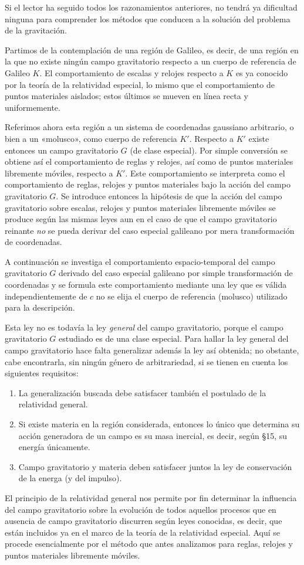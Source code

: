 \documentclass[spanish]{book}
\begin{document}
Si el lector ha seguido todos los razonamientos anteriores, no tendrá ya dificultad
ninguna para comprender los métodos que conducen a la solución del problema de la
gravitación.

Partimos de la contemplación de una región de Galileo, es decir, de una región en la
que no existe ningún campo gravitatorio respecto a un cuerpo de referencia de Galileo
$K$. El comportamiento de escalas y relojes respecto a $K$ es ya conocido por la teoría de
la relatividad especial, lo mismo que el comportamiento de puntos materiales
aislados; estos últimos se mueven en línea recta y uniformemente.

Referimos ahora esta región a un sistema de coordenadas gaussiano arbitrario, o
bien a un «molusco», como cuerpo de referencia $K'$. Respecto a $K'$ existe entonces un
campo gravitatorio $G$ (de clase especial). Por simple conversión se obtiene así el
comportamiento de reglas y relojes, así como de puntos materiales libremente
móviles, respecto a $K'$. Este comportamiento se interpreta como el comportamiento
de reglas, relojes y puntos materiales bajo la acción del campo gravitatorio $G$. Se
introduce entonces la hipótesis de que la acción del campo gravitatorio sobre escalas,
relojes y puntos materiales libremente móviles se produce según las mismas leyes aun
en el caso de que el campo gravitatorio reinante \textit{no} se pueda derivar del caso especial
galileano por mera transformación de coordenadas.

A continuación se investiga el comportamiento espacio-temporal del campo
gravitatorio $G$ derivado del caso especial galileano por simple transformación de
coordenadas y se formula este comportamiento mediante una ley que es válida
independientemente de $c$ no se elija el cuerpo de referencia (molusco) utilizado para
la descripción.

Esta ley no es todavía la ley \textit{general} del campo gravitatorio, porque el campo
gravitatorio $G$ estudiado es de una clase especial. Para hallar la ley general del
campo gravitatorio hace falta generalizar además la ley así obtenida; no obstante, cabe
encontrarla, sin ningún género de arbitrariedad, si se tienen en cuenta los siguientes
requisitos:
\begin{enumerate}
\item La generalización buscada debe satisfacer también el postulado de la relatividad general.
\item Si existe materia en la región considerada, entonces lo único que determina su acción generadora
de un campo es su masa inercial, es decir, según \S 15, su energía únicamente.
\item Campo gravitatorio y materia deben satisfacer juntos la ley de conservación de la energa (y del
impulso).
\end{enumerate}
El principio de la relatividad general nos permite por fin determinar la influencia del
campo gravitatorio sobre la evolución de todos aquellos procesos que en ausencia de
campo gravitatorio discurren según leyes conocidas, es decir, que están incluidos ya
en el marco de la teoría de la relatividad especial. Aquí se procede esencialmente por
el método que antes analizamos para reglas, relojes y puntos materiales libremente
móviles.
\end{document}
